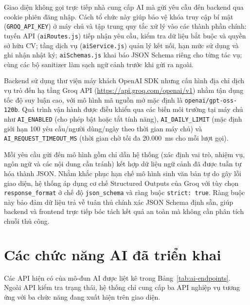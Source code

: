 Giao diện không gọi trực tiếp nhà cung cấp AI mà gửi yêu cầu đến backend qua cookie phiên đăng nhập. Cách tổ chức này giúp bảo vệ khóa truy cập bí mật (\texttt{GROQ\_API\_KEY}) ở máy chủ và tập trung quy tắc xử lý vào các thành phần chính: tuyến API (\texttt{aiRoutes.js}) tiếp nhận yêu cầu, kiểm tra dữ liệu bắt buộc và quyền sở hữu CV; tầng dịch vụ (\texttt{aiService.js}) quản lý kết nối, hạn mức sử dụng và ghi nhận nhật ký; \texttt{aiSchemas.js} khai báo JSON Schema riêng cho từng tác vụ; cùng các bộ sanitizer làm sạch ngữ cảnh trước khi gửi ra ngoài.

Backend sử dụng thư viện máy khách OpenAI SDK nhưng cấu hình địa chỉ dịch vụ trỏ đến hạ tầng Groq API (\url{https://api.groq.com/openai/v1}) nhằm tận dụng tốc độ suy luận cao, với mô hình mã nguồn mở mặc định là \texttt{openai/gpt-oss-120b}. Quá trình vận hành được điều khiển qua các biến môi trường tại máy chủ như \texttt{AI\_ENABLED} (cho phép bật hoặc tắt tính năng), \texttt{AI\_DAILY\_LIMIT} (mặc định giới hạn 100 yêu cầu/người dùng/ngày theo thời gian máy chủ) và \texttt{AI\_REQUEST\_TIMEOUT\_MS} (thời gian chờ tối đa 20.000~ms cho mỗi lượt gọi).

Mỗi yêu cầu gửi đến mô hình gồm chỉ dẫn hệ thống (xác định vai trò, nhiệm vụ, ngôn ngữ và các nội dung cần tránh) kết hợp dữ liệu ngữ cảnh đã được tuần tự hóa thành JSON. Nhằm khắc phục hạn chế mô hình sinh văn bản tự do gây lỗi giao diện, hệ thống áp dụng cơ chế Structured Outputs của Groq với tùy chọn \texttt{response\_format} ở chế độ \texttt{json\_schema} và ràng buộc \texttt{strict: true}. Ràng buộc này bảo đảm dữ liệu trả về tuân thủ chính xác JSON Schema định sẵn, giúp backend và frontend trực tiếp bóc tách kết quả an toàn mà không cần phân tích chuỗi thủ công.

\section{Các chức năng AI đã triển khai}

Các API hiện có của mô-đun AI được liệt kê trong Bảng~\ref{tab:ai-endpoints}. Ngoài API kiểm tra trạng thái, hệ thống chỉ cung cấp ba API nghiệp vụ tương ứng với ba chức năng đang xuất hiện trên giao diện.


